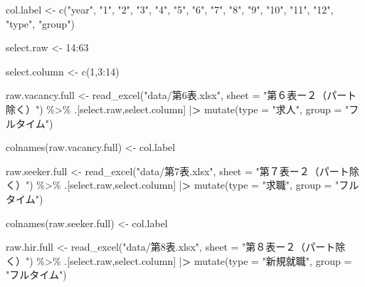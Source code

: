\documentclass[
]{book}
\newenvironment{Shaded}{\begin{snugshade}}{\end{snugshade}}
\newcommand{\AttributeTok}[1]{\textcolor[rgb]{0.77,0.63,0.00}{#1}}
\newcommand{\DecValTok}[1]{\textcolor[rgb]{0.00,0.00,0.81}{#1}}
\newcommand{\ErrorTok}[1]{\textcolor[rgb]{0.64,0.00,0.00}{\textbf{#1}}}
\newcommand{\FunctionTok}[1]{\textcolor[rgb]{0.00,0.00,0.00}{#1}}
\newcommand{\NormalTok}[1]{#1}
\newcommand{\OtherTok}[1]{\textcolor[rgb]{0.56,0.35,0.01}{#1}}
\newcommand{\SpecialCharTok}[1]{\textcolor[rgb]{0.00,0.00,0.00}{#1}}
\newcommand{\StringTok}[1]{\textcolor[rgb]{0.31,0.60,0.02}{#1}}
\begin{document}
\begin{Shaded}
\begin{Highlighting}[]
\NormalTok{col.label }\OtherTok{\textless{}{-}} 
   \FunctionTok{c}\NormalTok{(}\StringTok{"year"}\NormalTok{,}
     \StringTok{"1"}\NormalTok{,}
     \StringTok{"2"}\NormalTok{,}
     \StringTok{"3"}\NormalTok{,}
     \StringTok{"4"}\NormalTok{,}
     \StringTok{"5"}\NormalTok{,}
     \StringTok{"6"}\NormalTok{,}
     \StringTok{"7"}\NormalTok{,}
     \StringTok{"8"}\NormalTok{,}
     \StringTok{"9"}\NormalTok{,}
     \StringTok{"10"}\NormalTok{,}
     \StringTok{"11"}\NormalTok{,}
     \StringTok{"12"}\NormalTok{,}
     \StringTok{"type"}\NormalTok{,}
     \StringTok{"group"}\NormalTok{)}

\NormalTok{select.raw }\OtherTok{\textless{}{-}} \DecValTok{14}\SpecialCharTok{:}\DecValTok{63}

\NormalTok{select.column }\OtherTok{\textless{}{-}} \FunctionTok{c}\NormalTok{(}\DecValTok{1}\NormalTok{,}\DecValTok{3}\SpecialCharTok{:}\DecValTok{14}\NormalTok{)}

\NormalTok{raw.vacancy.full }\OtherTok{\textless{}{-}}
  \FunctionTok{read\_excel}\NormalTok{(}\StringTok{"data/第6表.xlsx"}\NormalTok{,}
             \AttributeTok{sheet =} \StringTok{"第６表ー２（パート除く）"}\NormalTok{) }\SpecialCharTok{\%\textgreater{}\%}
\NormalTok{  .[select.raw,select.column] }\SpecialCharTok{|}\ErrorTok{\textgreater{}} 
  \FunctionTok{mutate}\NormalTok{(}\AttributeTok{type =} \StringTok{"求人"}\NormalTok{,}
         \AttributeTok{group =} \StringTok{"フルタイム"}\NormalTok{)}

\FunctionTok{colnames}\NormalTok{(raw.vacancy.full) }\OtherTok{\textless{}{-}}\NormalTok{ col.label}

\NormalTok{raw.seeker.full }\OtherTok{\textless{}{-}}
  \FunctionTok{read\_excel}\NormalTok{(}\StringTok{"data/第7表.xlsx"}\NormalTok{,}
             \AttributeTok{sheet =} \StringTok{"第７表ー２（パート除く）"}\NormalTok{) }\SpecialCharTok{\%\textgreater{}\%}
\NormalTok{  .[select.raw,select.column] }\SpecialCharTok{|}\ErrorTok{\textgreater{}} 
  \FunctionTok{mutate}\NormalTok{(}\AttributeTok{type =} \StringTok{"求職"}\NormalTok{,}
         \AttributeTok{group =} \StringTok{"フルタイム"}\NormalTok{)}

\FunctionTok{colnames}\NormalTok{(raw.seeker.full) }\OtherTok{\textless{}{-}}\NormalTok{ col.label}

\NormalTok{raw.hir.full }\OtherTok{\textless{}{-}}
  \FunctionTok{read\_excel}\NormalTok{(}\StringTok{"data/第8表.xlsx"}\NormalTok{,}
             \AttributeTok{sheet =} \StringTok{"第８表ー２（パート除く）"}\NormalTok{) }\SpecialCharTok{\%\textgreater{}\%}
\NormalTok{  .[select.raw,select.column] }\SpecialCharTok{|}\ErrorTok{\textgreater{}} 
  \FunctionTok{mutate}\NormalTok{(}\AttributeTok{type =} \StringTok{"新規就職"}\NormalTok{,}
         \AttributeTok{group =} \StringTok{"フルタイム"}\NormalTok{)}


\end{Highlighting}
\end{Shaded}
\end{document}
